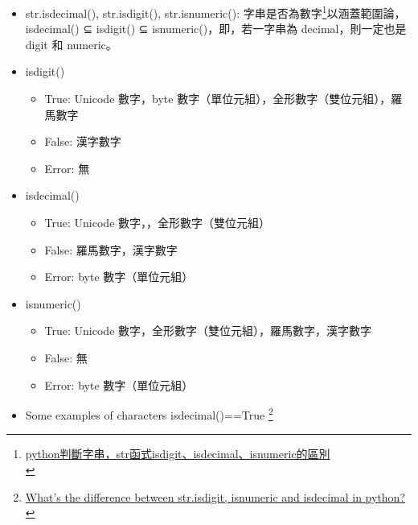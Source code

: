 \documentclass[a4paper,12pt]{article}
\begin{document}
\begin{enumerate}
\begin{itemize}
\item str.isdecimal(), str.isdigit(), str.isnumeric(): 字串是否為數字\footnote{\href{https://www.itread01.com/content/1550041754.html}{python判斷字串，str函式isdigit、isdecimal、isnumeric的區別}\\}以涵蓋範圍論，isdecimal() ⊆ isdigit() ⊆ isnumeric()，即，若一字串為 decimal，則一定也是 digit 和 numeric。\\
\item isdigit()\\
\begin{itemize}
\item True: Unicode 數字，byte 數字（單位元組），全形數字（雙位元組），羅馬數字\\
\item False: 漢字數字\\
\item Error: 無\\
\end{itemize}
\item isdecimal()\\
\begin{itemize}
\item True: Unicode 數字，，全形數字（雙位元組）\\
\item False: 羅馬數字，漢字數字\\
\item Error: byte 數字（單位元組）\\
\end{itemize}
\item isnumeric()\\
\begin{itemize}
\item True: Unicode 數字，全形數字（雙位元組），羅馬數字，漢字數字\\
\item False: 無\\
\item Error: byte 數字（單位元組）\\
\end{itemize}
\item Some examples of characters isdecimal()==True \footnote{\href{https://stackoverflow.com/questions/44891070/whats-the-difference-between-str-isdigit-isnumeric-and-isdecimal-in-python}{What's the difference between str.isdigit, isnumeric and isdecimal in python?}\\}\\
\begin{enumerate}

\end{enumerate}
\end{itemize}
\end{enumerate}
\end{document}
